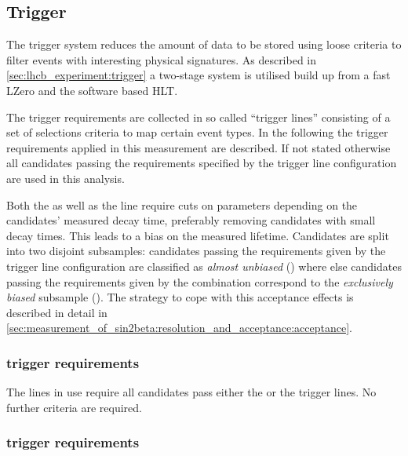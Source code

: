 \subsection{Trigger}
\label{sec:measurement_of_sin2beta:data_preparation:trigger}

The \LHCb trigger system reduces the amount of data to be stored using loose
criteria to filter events with interesting physical signatures. As described in
\cref{sec:lhcb_experiment:trigger} a two-stage system is utilised build up from
a fast \acf{LZero} and the software based \acf{HLT}.

The trigger requirements are collected in so called \enquote{trigger lines}
consisting of a set of selections criteria to map certain event types. In the
following the trigger requirements applied in this measurement are described. If
not stated otherwise all candidates passing the requirements specified by the
trigger line configuration \TriggerReq are used in this analysis.

Both the \HLTOneTrackMuon as well as the \HLTTwoDiMuonDetachedJpsi line require
cuts on parameters depending on the candidates' measured decay time, preferably
removing candidates with small decay times. This leads to a bias on the measured
lifetime. Candidates are split into two disjoint subsamples: candidates passing
the requirements given by the trigger line configuration \TriggerReqAU are
classified as \emph{almost unbiased} (\textbf{\catAU}) where else candidates
passing the requirements given by the combination \TriggerReqEB correspond to
the \emph{exclusively biased} subsample (\textbf{\catEB}). The strategy to cope
with this acceptance effects is described in detail in
\cref{sec:measurement_of_sin2beta:resolution_and_acceptance:acceptance}.

\subsubsection{\LZero trigger requirements}
\label{sec:measurement_of_sin2beta:data_preparation:trigger:lzero}

The \HLT lines in use require all candidates pass either the \LZeroMuon or the
\LZeroDiMuon trigger lines. No further \LZero criteria are required.

\subsubsection{\HLTOne trigger requirements}
\label{sec:measurement_of_sin2beta:data_preparation:trigger:hlt1}

